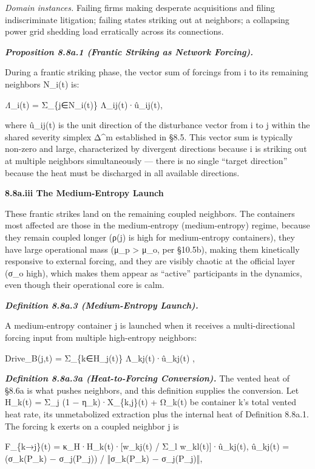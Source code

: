 \documentclass[
]{article}
\begin{document}
\emph{Domain instances.} Failing firms making desperate acquisitions and
filing indiscriminate litigation; failing states striking out at
neighbors; a collapsing power grid shedding load erratically across its
connections.

\emph{\textbf{Proposition 8.8a.1 (Frantic Striking as Network
Forcing).}}

During a frantic striking phase, the vector sum of forcings from i to
its remaining neighbors N\_i(t) is:

\emph{Λ⃗}\_i(t) = Σ\_\{j∈N\_i(t)\} Λ\_ij(t)·û\_ij(t),

where û\_ij(t) is the unit direction of the disturbance vector from i to
j within the shared severity simplex Δ\^{}m established in §8.5. This
vector sum is typically non-zero and large, characterized by divergent
directions because i is striking out at multiple neighbors
simultaneously --- there is no single ``target direction'' because the
heat must be discharged in all available directions.

\textbf{8.8a.iii The Medium-Entropy Launch}

These frantic strikes land on the remaining coupled neighbors. The
containers most affected are those in the medium-entropy
(medium-entropy) regime, because they remain coupled longer (ρ(j) is
high for medium-entropy containers), they have large operational mass
(μ\_p \textgreater{} μ\_o, per §10.5b), making them kinetically
responsive to external forcing, and they are visibly chaotic at the
official layer (σ\_o high), which makes them appear as ``active''
participants in the dynamics, even though their operational core is
calm.

\emph{\textbf{Definition 8.8a.3 (Medium-Entropy Launch).}}

A medium-entropy container j is launched when it receives a
multi-directional forcing input from multiple high-entropy neighbors:

Drive\_B(j,t) = Σ\_\{k∈H\_j(t)\} Λ\_kj(t)·û\_kj(t) ,

\emph{\textbf{Definition 8.8a.3a (Heat-to-Forcing Conversion).}} The
vented heat of §8.6a is what pushes neighbors, and this definition
supplies the conversion. Let H\_k(t) = Σ\_j (1 − η\_k)·X\_\{k,j\}(t) +
Ω\_k(t) be container k's total vented heat rate, its unmetabolized
extraction plus the internal heat of Definition 8.8a.1. The forcing k
exerts on a coupled neighbor j is

F\_\{k→j\}(t) = κ\_H·H\_k(t)·{[}w\_kj(t) / Σ\_l w\_kl(t){]}·û\_kj(t),
û\_kj(t) = (σ\_k(P\_k) − σ\_j(P\_j)) / ‖σ\_k(P\_k) − σ\_j(P\_j)‖,
\end{document}
